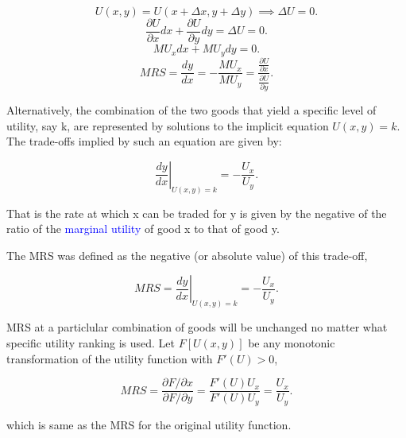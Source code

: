 \documentclass{tufte-handout}
\begin{document}
\[
U(x,y) = U(x + \Delta x, y + \Delta y) \implies \Delta U = 0
.\] 
\[ \frac{\partial U}{\partial x}dx + \frac{\partial U}{\partial y}dy = \Delta U = 0
.\] 
\[
MU_xdx + MU_yd y = 0
.\] 
 \[
MRS = \frac{dy}{dx} = - \frac{MU_x}{MU_y} = \frac{\frac{\partial U}{\partial x}}{\frac{\partial U}{\partial y}}
.\] 

Alternatively, the combination of the two goods that yield a specific level of utility, say k, are represented by solutions to the implicit equation $U(x,y) = k$. The trade-offs implied by such an equation are given by:


\[
		\left. \frac{dy}{dx} \right |_{U(x,y)=k} = - \frac{U_x}{U_y}
.\] 

That is the rate at which x can be traded for y is given by the negative of the ratio of the \textcolor{blue}{marginal utility} of good x to that of good y. 

\textbullet   The MRS was defined as the negative (or absolute value) of this trade-off, 


\[
MRS =		\left. \frac{dy}{dx} \right |_{U(x,y)=k} = - \frac{U_x}{U_y}

.\] 



\textbullet  MRS at a particlular combination of goods will be unchanged no matter what specific utility ranking is used. Let
$F[U(x,y)]$ be any monotonic transformation of the utility function with $F'(U) > 0$,

 \[
		 MRS = \frac{\partial{F}/ \partial{x}}{\partial{F}/ \partial{y}  } = \frac{F'(U)U_x}{F'(U)U_y} = \frac{U_x}{U_y}
.\] 

which is same as the MRS for the original utility function.


\end{document}
